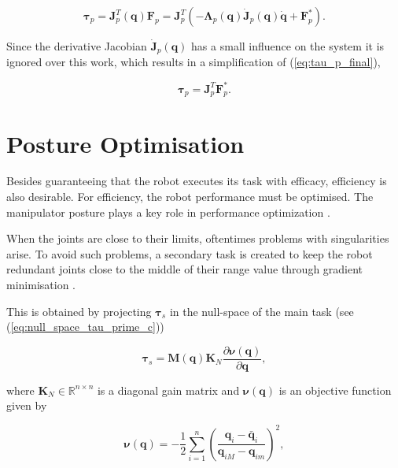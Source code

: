 \begin{equation}
    \label{eq:tau_p_final}
    \boldsymbol{\tau}_p = \boldsymbol{J}^T_p(\boldsymbol{q}) \boldsymbol{F}_p = \boldsymbol{J}^T_p (-\boldsymbol{\Lambda}_p(\boldsymbol{q}) \boldsymbol{\dot{J}}_p(\boldsymbol{q}) \boldsymbol{\dot{q}} + \boldsymbol{F}^*_p).
\end{equation}

Since the derivative Jacobian $\boldsymbol{\dot{J}}_p(\boldsymbol{q})$ has a small influence on the system it is ignored over this work, which results in a simplification of (\ref{eq:tau_p_final}),

\begin{equation}
    \boldsymbol{\tau}_p = \boldsymbol{J}^T_p \boldsymbol{F}^*_p .
\end{equation}


\section{Posture Optimisation}
\label{sec:control_architectures_posture_optimisation}

Besides guaranteeing that the robot executes its task with efficacy, efficiency is also desirable. For efficiency, the robot performance must be optimised. The manipulator posture plays a key role in performance optimization \cite{Ochoa2019_control_architecture_robotic_polishing}. 

When the joints are close to their limits, oftentimes problems with singularities arise. To avoid such problems, a secondary task is created to keep the robot redundant joints close to the middle of their range value through gradient minimisation \cite{Santos2018_computed_torque_control_robotic_assisted_tele_ecography}.

This is obtained by projecting $\boldsymbol{\tau}_s$ in the null-space of the main task (see (\ref{eq:null_space_tau_prime_c}))

\begin{equation}
    \boldsymbol{\tau}_s = \boldsymbol{M}(\boldsymbol{q}) \boldsymbol{K}_N \frac{\partial\boldsymbol{\nu}(\boldsymbol{q})}{\partial\boldsymbol{q}},
\end{equation}

where $\boldsymbol{K}_N \in \mathbb{R}^{n\times n}$ is a diagonal gain matrix and $\boldsymbol{\nu}(\boldsymbol{q})$ is an objective function given by

\begin{equation}
    \boldsymbol{\nu}(\boldsymbol{q}) = - \frac{1}{2} \sum_{i=1}^{n}  \left(\frac{\boldsymbol{q}_i - \boldsymbol{\bar{q}}_i}{\boldsymbol{q}_{iM} - \boldsymbol{q}_{im}}\right)^2,
\end{equation}

